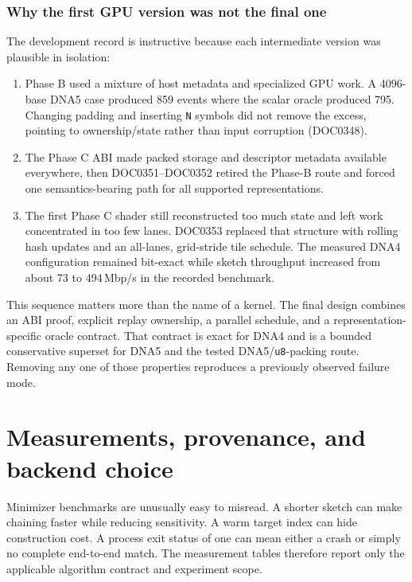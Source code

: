 \subsubsection{Why the first GPU version was not the final one}

The development record is instructive because each intermediate version was
plausible in isolation:

\begin{enumerate}
  \item Phase B used a mixture of host metadata and specialized GPU work.  A
  4096-base DNA5 case produced 859 events where the scalar oracle produced
  795.  Changing padding and inserting \texttt{N} symbols did not remove the
  excess, pointing to ownership/state rather than input corruption
  (DOC0348).
  \item The Phase C ABI made packed storage and descriptor metadata available
  everywhere, then DOC0351--DOC0352 retired the Phase-B route and forced one
  semantics-bearing path for all supported representations.
  \item The first Phase C shader still reconstructed too much state and left
  work concentrated in too few lanes.  DOC0353 replaced that structure with
  rolling hash updates and an all-lanes, grid-stride tile schedule. The
  measured DNA4 configuration remained bit-exact while sketch throughput
  increased from about 73 to 494\,Mbp/s in the recorded benchmark.
\end{enumerate}

This sequence matters more than the name of a kernel. The final design combines
an ABI proof, explicit replay ownership, a parallel schedule, and a
representation-specific oracle contract. That contract is exact for DNA4 and
is a bounded conservative superset for DNA5 and the tested DNA5/\texttt{u8}-packing
route. Removing any one of those properties reproduces a previously observed
failure mode.

\section{Measurements, provenance, and backend choice}
\label{sec:minimizer-results}

Minimizer benchmarks are unusually easy to misread. A shorter sketch can make
chaining faster while reducing sensitivity. A warm target index can hide
construction cost. A process exit status of one can mean either a crash or
simply no complete end-to-end match. The measurement tables therefore report
only the applicable algorithm contract and experiment scope.

